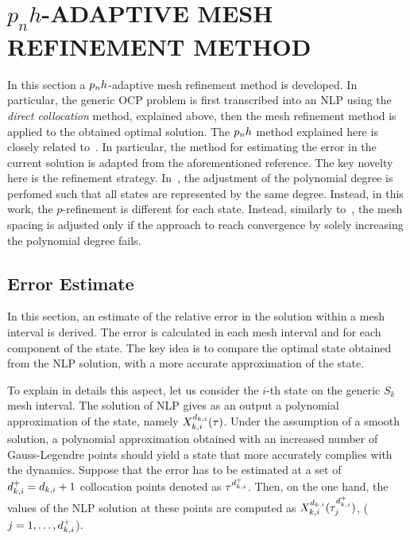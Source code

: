 \section*{$p_n h$-ADAPTIVE MESH REFINEMENT METHOD}

In this section a $p_{n}h$-adaptive mesh refinement method is developed. In particular, the generic OCP problem is first transcribed into an NLP using the \emph{direct collocation} method, explained above, then the mesh refinement method is applied to the obtained optimal solution.
The $p_{n}h$ method explained here is closely related to~\cite{Patterson:OCAM:2015}. In particular, the method for estimating the error in the current solution is adapted from the aforementioned reference. The key novelty here is the refinement strategy.
In~\cite{Patterson:OCAM:2015}, the adjustment of the polynomial degree is perfomed such that all states are represented by the same degree. Instead, in this work, the $p$-refinement is different for each state. Instead, similarly to~\cite{Patterson:OCAM:2015}, the mesh spacing is adjusted only if the approach to reach convergence by solely increasing the polynomial degree fails.


\subsection*{Error Estimate}

In this section, an estimate of the relative error in the solution within a mesh interval is derived. The error is calculated in each mesh interval and for each component of the state.
The key idea is to compare the optimal state obtained from the NLP solution, with a more accurate approximation of the state.

To explain in details this aspect, let us consider the $i$-th state on the generic $S_k$ mesh interval.
The solution of NLP gives as an output a polynomial approximation of the state, namely $X_{k,i}^{d_{k,i}} (\tau)$.
Under the assumption of a smooth solution, a polynomial approximation obtained with an increased number of Gauss-Legendre points should yield a state that more accurately complies with the dynamics.
Suppose that the error has to be estimated at a set of  $d_{k,i}^{+} = d_{k,i} + 1$ collocation points denoted as $\tau^{{d}_{k,i}^{+}}$.
Then, on the one hand, the values of the NLP solution at these points are computed as $X_{k,i}^{d_{k,i}} (\tau^{{d}_{k,i}^{+}}_j)$, ($j = 1, \dots, d_{k,i}^{+}$).

